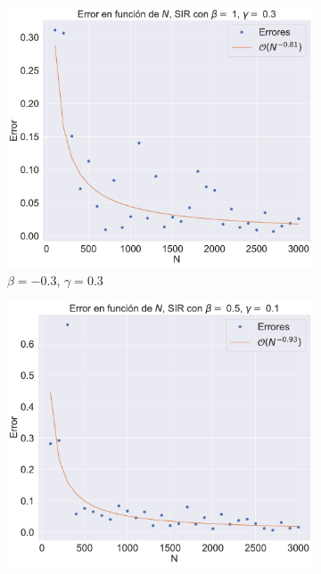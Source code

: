 \begin{figure}[h]
    \centering
    \begin{subfigure}[b]{0.32\textwidth}
        \centering
        \includegraphics[width=\textwidth]{img/content/chapter3/SIR1Errors.pdf}
        \caption{$\beta=-0.3$, $\gamma=0.3$}
    \end{subfigure}
    \hfill
    \begin{subfigure}[b]{0.32\textwidth}
        \centering
        \includegraphics[width=\textwidth]{img/content/chapter3/SIR2Errors.pdf}

\end{subfigure}
\end{figure}
